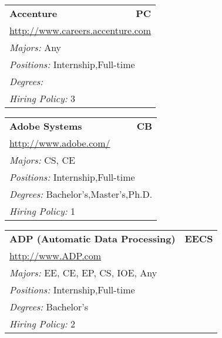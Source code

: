\documentclass[twoside]{article}
\begin{document}
\begin{center}
\begin{multicols}{3}
\begin{FlushLeft}
\begin{minipage}{\columnwidth}
\end{minipage}
 
\begin{minipage}{\columnwidth}\begin{tabularx}{.95\columnwidth}{Xr}
                 {\Large\bf Accenture} & {\Large\bf PC}\\
    \multicolumn{2}{p{.95\columnwidth}}{\url{http://www.careers.accenture.com}}\\
    \multicolumn{2}{p{.95\columnwidth}}{\emph{Majors:} Any}\\
    \multicolumn{2}{p{.95\columnwidth}}{\emph{Positions:} Internship,Full-time}\\
    \multicolumn{2}{p{.95\columnwidth}}{\emph{Degrees:} }\\
    \multicolumn{2}{p{.95\columnwidth}}{\emph{Hiring Policy:} 3}\\
    \end{tabularx}
    
\end{minipage}
 
\begin{minipage}{\columnwidth}\begin{tabularx}{.95\columnwidth}{Xr}
                 {\Large\bf Adobe Systems} & {\Large\bf CB}\\
    \multicolumn{2}{p{.95\columnwidth}}{\url{http://www.adobe.com/}}\\
    \multicolumn{2}{p{.95\columnwidth}}{\emph{Majors:} CS, CE}\\
    \multicolumn{2}{p{.95\columnwidth}}{\emph{Positions:} Internship,Full-time}\\
    \multicolumn{2}{p{.95\columnwidth}}{\emph{Degrees:} Bachelor's,Master's,Ph.D.}\\
    \multicolumn{2}{p{.95\columnwidth}}{\emph{Hiring Policy:} 1}\\
    \end{tabularx}
    
\end{minipage}
 
\begin{minipage}{\columnwidth}\begin{tabularx}{.95\columnwidth}{Xr}
                 {\Large\bf ADP (Automatic Data Processing)} & {\Large\bf EECS}\\
    \multicolumn{2}{p{.95\columnwidth}}{\url{http://www.ADP.com}}\\
    \multicolumn{2}{p{.95\columnwidth}}{\emph{Majors:} EE, CE, EP, CS, IOE, Any}\\
    \multicolumn{2}{p{.95\columnwidth}}{\emph{Positions:} Internship,Full-time}\\
    \multicolumn{2}{p{.95\columnwidth}}{\emph{Degrees:} Bachelor's}\\
    \multicolumn{2}{p{.95\columnwidth}}{\emph{Hiring Policy:} 2}\\
    \end{tabularx}
    

\end{minipage}
\end{FlushLeft}
\end{multicols}
\end{center}
\end{document}
